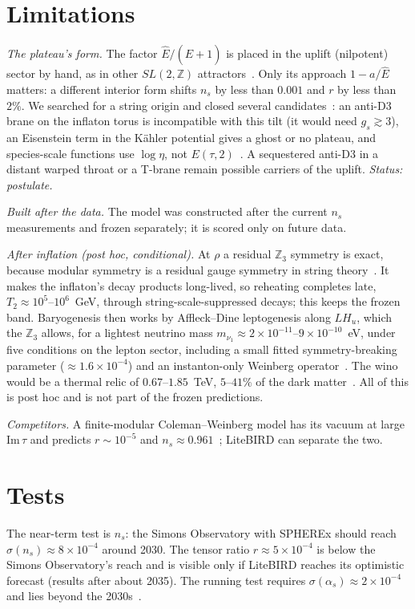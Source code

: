 \documentclass[aps,prd,twocolumn,superscriptaddress,nofootinbib,showkeys]{revtex4-2}
\begin{document}
\section{Limitations}\label{sec:limits}
\emph{The plateau's form.} The factor $\hat E/(\hat E+1)$ is placed in the uplift (nilpotent) sector by hand, as in other $SL(2,\mathbb{Z})$ attractors~\cite{KLsl2z}. Only its approach $1-a/\hat E$ matters: a different interior form shifts $n_s$ by less than $0.001$ and $r$ by less than $2\%$. We searched for a string origin and closed several candidates~\cite{P2}: an anti-D3 brane on the inflaton torus is incompatible with this tilt (it would need $g_s\gtrsim3$), an Eisenstein term in the K\"ahler potential gives a ghost or no plateau, and species-scale functions use $\log\eta$, not $E(\tau,2)$~\cite{CasasIbanez,Masias}. A sequestered anti-D3 in a distant warped throat or a T-brane remain possible carriers of the uplift. \emph{Status: postulate.}

\emph{Built after the data.} The model was constructed after the current $n_s$ measurements and frozen separately; it is scored only on future data.

\emph{After inflation (post hoc, conditional).} At $\rho$ a residual $\mathbb{Z}_3$ symmetry is exact, because modular symmetry is a residual gauge symmetry in string theory~\cite{GPR}. It makes the inflaton's decay products long-lived, so reheating completes late, $T_2\approx10^5$--$10^6$~GeV, through string-scale-suppressed decays; this keeps the frozen band. Baryogenesis then works by Affleck--Dine leptogenesis along $LH_u$, which the $\mathbb{Z}_3$ allows, for a lightest neutrino mass $m_{\nu_1}\approx2\times10^{-11}$--$9\times10^{-10}$~eV, under five conditions on the lepton sector, including a small fitted symmetry-breaking parameter ($\approx1.6\times10^{-4}$) and an instanton-only Weinberg operator~\cite{SERAPIS}. The wino would be a thermal relic of $0.67$--$1.85$~TeV, $5$--$41\%$ of the dark matter~\cite{Fermi,ATLAS}. All of this is post hoc and is not part of the frozen predictions.

\emph{Competitors.} A finite-modular Coleman--Weinberg model has its vacuum at large $\mathrm{Im}\,\tau$ and predicts $r\sim10^{-5}$ and $n_s\approx0.961$~\cite{FMCW}; LiteBIRD can separate the two.

\section{Tests}
The near-term test is $n_s$: the Simons Observatory with SPHEREx should reach $\sigma(n_s)\approx8\times10^{-4}$ around 2030. The tensor ratio $r\approx5\times10^{-4}$ is below the Simons Observatory's reach and is visible only if LiteBIRD reaches its optimistic forecast (results after about 2035). The running test requires $\sigma(\alpha_s)\approx2\times10^{-4}$ and lies beyond the 2030s~\cite{P1}.
\end{document}
